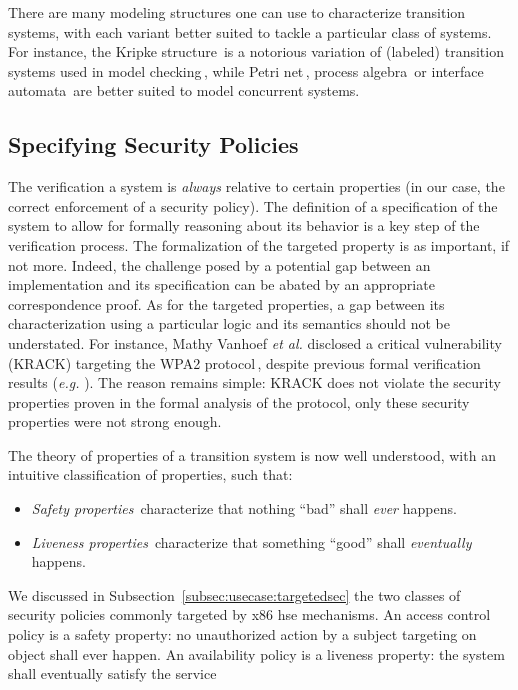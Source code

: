 \documentclass[oneside,a4paper]{memoir}
\theoremstyle{break}
\begin{document}
There are many modeling structures one can use to characterize transition
systems, with each variant better suited to tackle a particular class of
systems.
%
For instance, the Kripke structure\,\cite{kripke1971semantical} is a notorious
variation of (labeled) transition systems used in model
checking\,\cite{clarke1999model}, while Petri net\,\cite{peterson1981petri},
process algebra\,\cite{bergstra1984process} or interface
automata\,\cite{de2001interface} are better suited to model concurrent systems.

\subsection{Specifying Security Policies}
\label{sec:sota:security}

The verification a system is \emph{always} relative to certain properties (in
our case, the correct enforcement of a security policy).
%
The definition of a specification of the system to allow for formally reasoning
about its behavior is a key step of the verification process.
%
The formalization of the targeted property is as important, if not more.
%
Indeed, the challenge posed by a potential gap between an implementation and its
specification can be abated by an appropriate correspondence proof.
%
As for the targeted properties, a gap between its characterization using a
particular logic and its semantics should not be understated.
%
For instance, Mathy Vanhoef \emph{et al.} disclosed a critical vulnerability
(KRACK) targeting the WPA2 protocol\,\cite{vanhoef2017key}, despite previous
formal verification results (\emph{e.g.} \cite{he2004analysis}).
%
The reason remains simple: KRACK does not violate the security properties proven
in the formal analysis of the protocol, only these security properties were not
strong enough.

The theory of properties of a transition system is now well understood, with an
intuitive classification of properties, such that:
%
\begin{itemize}
\item \emph{Safety properties}\,\cite{lamport1977proving,lamport1985logical}
  characterize that nothing ``bad'' shall \emph{ever} happens.
\item \emph{Liveness properties}\,\cite{lamport1985logical,alpern1985liveness}
  characterize that something ``good'' shall \emph{eventually} happens.
\end{itemize}

We discussed in Subsection~\ref{subsec:usecase:targetedsec} the two classes of
security policies commonly targeted by x86 \ac{hse} mechanisms.
%
An access control policy is a safety property: no unauthorized action by a
subject targeting on object shall ever happen.
%
An availability policy is a liveness property: the system shall eventually
satisfy the service
\end{document}
